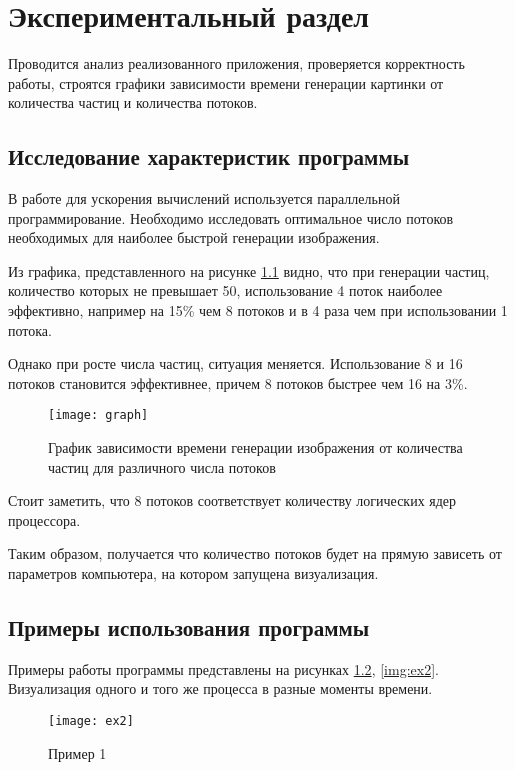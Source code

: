\chapter{\textbf{Экспериментальный раздел}}

Проводится анализ реализованного приложения, проверяется корректность работы, строятся графики зависимости времени генерации картинки от количества частиц и количества потоков. 

\section{\textbf{Исследование характеристик программы }}

В работе для ускорения вычислений используется параллельной программирование. Необходимо исследовать оптимальное число потоков необходимых для наиболее быстрой генерации изображения. 

Из графика, представленного на рисунке \ref{img:graph} видно, что при генерации частиц, количество которых не превышает 50, использование 4 поток наиболее эффективно, например на 15\% чем 8 потоков и в 4 раза чем при использовании 1 потока. 

Однако при росте числа частиц, ситуация меняется. Использование 8 и 16 потоков становится эффективнее, причем 8 потоков быстрее чем 16 на 3\%. 

\begin{figure}[H]
	\centering
	\texttt{[image: graph]}
	\caption{График зависимости времени генерации изображения от количества частиц для различного числа потоков}
	\label{img:graph}
\end{figure}

Стоит заметить, что 8 потоков соответствует количеству логических ядер процессора. 

Таким образом, получается что количество потоков будет на прямую зависеть от параметров компьютера, на котором запущена визуализация. 

\section{\textbf{Примеры использования программы }}

Примеры работы программы представлены на рисунках \ref{img:ex1}, \ref{img:ex2}. Визуализация одного и того же процесса в разные моменты времени. 

\begin{figure}[H]
	\centering
	\texttt{[image: ex2]}
	\caption{Пример 1}
	\label{img:ex1}
\end{figure}

